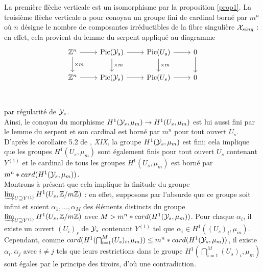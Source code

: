 \documentclass[11pt]{article}
\begin{document}
La première flèche verticale est un isomorphisme par la proposition \ref{prop1}. La troisième flèche verticale a pour conoyau un groupe fini de cardinal borné par $m^n$ où $n$ désigne le nombre de composantes irréductibles de la fibre singulière $\mathcal{X}_{sing}$ : en effet, cela provient du lemme du serpent appliqué au diagramme
\[\begin{tikzcd}
    \Z^{n} & \Pic(\CY_s) & \Pic(U_s) & 0 \\
    \Z^{n} & \Pic(\CY_s) & \Pic(U_s) & 0\\
    \arrow[from=1-1, to=2-1, "\times m"]
	\arrow[from=1-1, to=1-2]
    \arrow[from=1-2, to=1-3]
    \arrow[from=1-3, to=1-4]
	\arrow[from=2-1, to=2-2]
    \arrow[from=2-2, to=2-3]
    \arrow[from=2-3, to=2-4]
    \arrow[from=1-2, to=2-2, "\times m"]
    \arrow[from=1-3, to=2-3, "\times m"]
    \arrow[from=1-4, to=2-4]
\end{tikzcd}\]
par régularité de $\mathcal{Y}_s$.\\

Ainsi, le conoyau du morphisme $H^1(\mathcal{Y}_s, \mu_m) \rightarrow H^1(U_s, \mu_m)$ est lui aussi fini par le lemme du serpent et son cardinal est borné par $m^n$ pour tout ouvert $U_s$. D'après le corollaire 5.2 de \cite{SGA4}, \textit{XIX}, la groupe $H^1(\mathcal{Y}_s, \mu_m)$ est fini; cela implique que les groupes $H^1(U_s, \mu_m)$ sont également finis pour tout ouvert $U_s$ contenant $Y^{(1)}$ et le cardinal de tous les groupes $H^1(U_s, \mu_m)$ est borné par $m^n*card(H^1(\mathcal{Y}_s, \mu_m))$.\\

Montrons à présent que cela implique la finitude du groupe $\varinjlim_{U \supseteq Y^{(1)}} H^1(U_s, \mathbb{Z} / m\mathbb{Z})$ : en effet,  supposons par l'absurde que ce groupe soit infini et soient $\alpha_1,...,\alpha_M$ des éléments distincts du groupe $\varinjlim_{U \supseteq Y^{(1)}} H^1(U_s, \mathbb{Z} / m\mathbb{Z})$  avec $M > m^n*card(H^1(\mathcal{Y}_s, \mu_m))$. Pour chaque $\alpha_i$, il existe un ouvert $(U_i)_s$ de $\mathcal{Y}_s$ contenant $Y^{(1)}$ tel que $\alpha_i \in H^1((U_s)_i, \mu_m)$. Cependant,  comme $ card(H^1(\bigcap_{i=1}^M (U_s)_i, \mu_m)) \leq m^n*card(H^1(\mathcal{Y}_s, \mu_m)) $, il existe $\alpha_i, \alpha_j$ avec $i \neq j$ tels que leurs restrictions dans le groupe $ H^1(\bigcap_{i=1}^M (U_s)_i, \mu_m)$ sont égales par le principe des tiroirs, d'où une contradiction.\\
\end{document}
